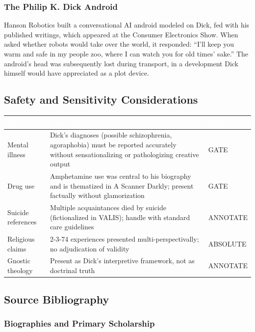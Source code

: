 \documentclass[11pt,letterpaper]{article}
\newcommand{\tableheader}[1]{\textbf{\sffamily\textcolor{white}{#1}}}
\begin{document}
\subsubsection{The Philip K. Dick Android}

Hanson Robotics built a conversational AI android modeled on Dick, fed with his published writings, which appeared at the Consumer Electronics Show. When asked whether robots would take over the world, it responded: ``I'll keep you warm and safe in my people zoo, where I can watch you for old times' sake.'' The android's head was subsequently lost during transport, in a development Dick himself would have appreciated as a plot device.

\subsection{Safety and Sensitivity Considerations}

\begin{center}
\begin{tabularx}{\textwidth}{L{3.5cm}XC{2cm}}
\toprule
{}
\tableheader{Topic} & \tableheader{Consideration} & \tableheader{Boundary} \\
\midrule
Mental illness & Dick's diagnoses (possible schizophrenia, agoraphobia) must be reported accurately without sensationalizing or pathologizing creative output & GATE \\
Drug use & Amphetamine use was central to his biography and is thematized in A Scanner Darkly; present factually without glamorization & GATE \\
Suicide references & Multiple acquaintances died by suicide (fictionalized in VALIS); handle with standard care guidelines & ANNOTATE \\
Religious claims & 2-3-74 experiences presented multi-perspectivally; no adjudication of validity & ABSOLUTE \\
Gnostic theology & Present as Dick's interpretive framework, not as doctrinal truth & ANNOTATE \\
\bottomrule
\end{tabularx}
\end{center}

\subsection{Source Bibliography}

\subsubsection{Biographies and Primary Scholarship}
\end{document}
